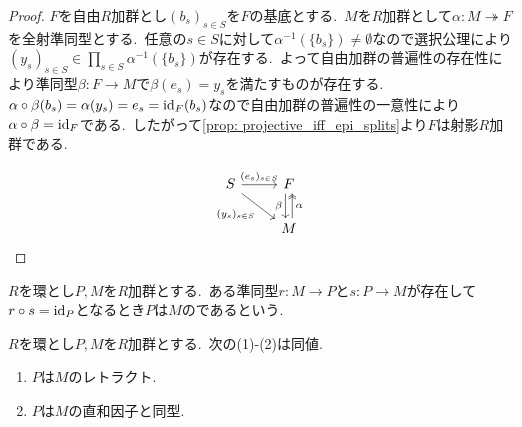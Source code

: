 \begin{proof}
$F$を自由$R$加群とし$(b_s)_{s \in S}$を$F$の基底とする.\
$M$を$R$加群として$\alpha \colon M \twoheadrightarrow F$を全射準同型とする.\
任意の$s \in S$に対して$\alpha^{-1}(\{b_s\}) \neq \emptyset$なので選択公理により$(y_s)_{s \in S} \in \prod_{s \in S} \alpha^{-1}(\{b_s\})$が存在する.\
よって自由加群の普遍性の存在性により準同型$\beta \colon F \to M$で$\beta(e_s) = y_s$を満たすものが存在する.\
$\alpha \circ \beta(b_s) = \alpha(y_s) = e_s = \operatorname{id}_F(b_s)$なので自由加群の普遍性の一意性により$\alpha \circ \beta = \operatorname{id}_F$である.\
したがって\cref{prop: projective_iff_epi_splits}より$F$は射影$R$加群である.

\[\begin{tikzcd}
	S & F \\
	& M
	\arrow["{(e_s)_{s \in S}}", from=1-1, to=1-2]
	\arrow["{(y_s)_{s \in S}}"', from=1-1, to=2-2]
	\arrow["\beta"', shift right, from=1-2, to=2-2]
	\arrow["\alpha"', shift right, two heads, from=2-2, to=1-2]
\end{tikzcd}\]
\end{proof}

\begin{definition} \label{def: IsRetract}
$R$を環とし$P,M$を$R$加群とする.\
ある準同型$r \colon M \to P$と$s \colon P \to M$が存在して$r \circ s = \operatorname{id}_P$となるとき$P$は$M$のであるという.
\end{definition}

\begin{lemma} \label{lem: retract_iff_summand}
$R$を環とし$P,M$を$R$加群とする.\
次の(1)-(2)は同値.
\def\labelenumi{(\theenumi)\hspace{.5\zw}}
\begin{enumerate}
	\item $P$は$M$のレトラクト.
    \item $P$は$M$の直和因子と同型.
\end{enumerate}
\end{lemma}

